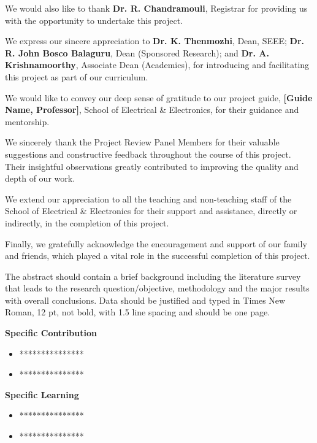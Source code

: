 \documentclass[a4paper, 12pt, oneside]{sastra_eee}
\begin{document}
\par We would also like to thank \textbf{Dr. R. Chandramouli}, Registrar for providing us with the opportunity to undertake this project.

\par We express our sincere appreciation to \textbf{Dr. K. Thenmozhi}, Dean, SEEE; \textbf{Dr. R. John Bosco Balaguru}, Dean (Sponsored Research); and \textbf{Dr. A. Krishnamoorthy}, Associate Dean (Academics), for introducing and facilitating this project as part of our curriculum.

\par We would like to convey our deep sense of gratitude to our project guide, \textbf{[Guide Name, Professor]}, School of Electrical \& Electronics, for their guidance and mentorship.

\par We sincerely thank the Project Review Panel Members for their valuable suggestions and constructive feedback throughout the course of this project. Their insightful observations greatly contributed to improving the quality and depth of our work.

\par We extend our appreciation to all the teaching and non-teaching staff of the School of Electrical \& Electronics for their support and assistance, directly or indirectly, in the completion of this project.

\par Finally, we gratefully acknowledge the encouragement and support of our family and friends, which played a vital role in the successful completion of this project.

	\pagebreak
	
	\abstract
	
	\vspace*{12pt}
	
The abstract should contain a brief background including the literature survey that leads to the research question/objective, methodology and the major results with overall conclusions. Data should be justified and typed in Times New Roman, 12 pt, not bold, with 1.5 line spacing and should be one page.
	
	\noindent \textbf{Specific Contribution}
	\begin{itemize}
		\item ***************
		\item ***************
	\end{itemize}
	\noindent \textbf{Specific Learning}
	\begin{itemize}
		\item ***************
		\item ***************
	\end{itemize}
	
\end{document}
